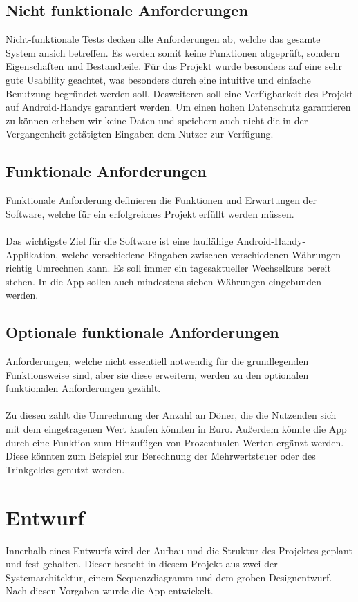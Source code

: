 \documentclass[conference]{IEEEtran}
\begin{document}
\subsection{Nicht funktionale Anforderungen}
Nicht-funktionale Tests decken alle Anforderungen ab, welche das gesamte System ansich betreffen. Es werden somit keine Funktionen abgeprüft, sondern Eigenschaften und Bestandteile. Für das Projekt wurde besonders auf eine sehr gute Usability geachtet, was besonders durch eine intuitive und einfache Benutzung begründet werden soll.
Desweiteren soll eine Verfügbarkeit des Projekt auf Android-Handys garantiert werden. Um einen hohen Datenschutz garantieren zu können erheben wir keine Daten und speichern auch nicht die in der Vergangenheit getätigten Eingaben dem Nutzer zur Verfügung. 

\subsection{Funktionale Anforderungen}
Funktionale Anforderung definieren die Funktionen und Erwartungen der Software, welche für ein erfolgreiches Projekt erfüllt werden müssen. \\\\
Das wichtigste Ziel für die Software ist eine lauffähige Android-Handy-Applikation, welche verschiedene Eingaben zwischen verschiedenen Währungen richtig Umrechnen kann. Es soll immer ein tagesaktueller Wechselkurs bereit stehen. In die App sollen auch mindestens sieben Währungen eingebunden werden.

\subsection{Optionale funktionale Anforderungen}
Anforderungen, welche nicht essentiell notwendig für die grundlegenden Funktionsweise sind, aber sie diese erweitern, werden zu den optionalen funktionalen Anforderungen gezählt. \\\\
Zu diesen zählt die Umrechnung der Anzahl an Döner, die die Nutzenden sich mit dem eingetragenen Wert kaufen könnten in Euro. Außerdem könnte die App durch eine Funktion zum Hinzufügen von Prozentualen Werten ergänzt werden. Diese könnten zum Beispiel zur Berechnung der Mehrwertsteuer oder des Trinkgeldes genutzt werden.

\section{Entwurf}
Innerhalb eines Entwurfs wird der Aufbau und die Struktur des Projektes geplant und fest gehalten. Dieser besteht in diesem Projekt aus zwei der Systemarchitektur, einem Sequenzdiagramm und dem groben Designentwurf. Nach diesen Vorgaben wurde die App entwickelt.
\end{document}
